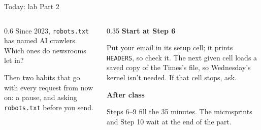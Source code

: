 \documentclass[9pt,aspectratio=169]{beamer}
\begin{document}
\begin{frame}{Today: lab Part 2}
    \begin{columns}[T]
        \begin{column}{0.6\textwidth}
            Since 2023, \texttt{robots.txt} has named AI crawlers. Which ones do newsrooms let in?

            \medskip
            Then two habits that go with every request from now on: a pause, and asking \texttt{robots.txt} before you send.
        \end{column}
        \begin{column}{0.35\textwidth}
            \textbf{Start at Step 6}\\[2pt]
            {\footnotesize Put your email in its setup cell; it prints \texttt{HEADERS}, so check it. The next given cell loads a saved copy of the Times's file, so Wednesday's kernel isn't needed. If that cell stops, ask.\par}
            \medskip
            \textbf{After class}\\[2pt]
            {\footnotesize Steps 6--9 fill the 35 minutes. The microsprints and Step 10 wait at the end of the part.\par}
        \end{column}
    \end{columns}
\end{frame}
\end{document}
